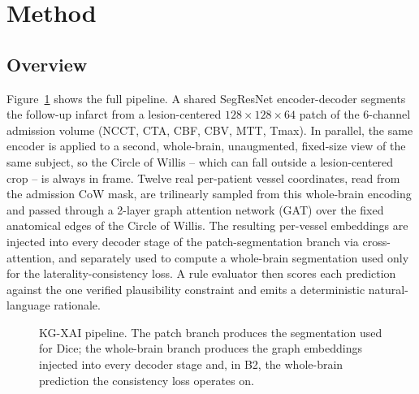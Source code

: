 \documentclass[conference]{IEEEtran}
\begin{document}
\section{Method}

\subsection{Overview}
Figure~\ref{fig:pipeline} shows the full pipeline. A shared SegResNet \cite{myronenko2018} encoder-decoder segments the follow-up infarct from a lesion-centered $128{\times}128{\times}64$ patch of the 6-channel admission volume (NCCT, CTA, CBF, CBV, MTT, Tmax). In parallel, the same encoder is applied to a second, whole-brain, unaugmented, fixed-size view of the same subject, so the Circle of Willis -- which can fall outside a lesion-centered crop -- is always in frame. Twelve real per-patient vessel coordinates, read from the admission CoW mask, are trilinearly sampled from this whole-brain encoding and passed through a 2-layer graph attention network (GAT) \cite{velickovic2018} over the fixed anatomical edges of the Circle of Willis. The resulting per-vessel embeddings are injected into every decoder stage of the patch-segmentation branch via cross-attention, and separately used to compute a whole-brain segmentation used only for the laterality-consistency loss. A rule evaluator then scores each prediction against the one verified plausibility constraint and emits a deterministic natural-language rationale.

\begin{figure}[t]
\centering
{}
\caption{KG-XAI pipeline. The patch branch produces the segmentation used for Dice; the whole-brain branch produces the graph embeddings injected into every decoder stage and, in B2, the whole-brain prediction the consistency loss operates on.}
\label{fig:pipeline}
\end{figure}
\end{document}
